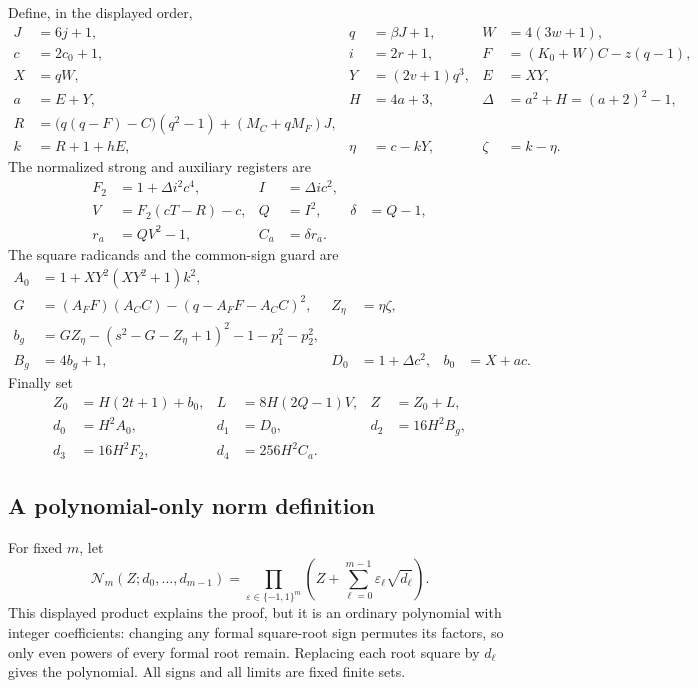 \documentclass[11pt]{article}
\newcommand{\Nm}{\mathcal N}
\theoremstyle{remark}
\begin{document}
Define, in the displayed order,
\begin{align}
 J&=6j+1,&q&=\beta J+1,&W&=4(3w+1),\nonumber\\
 c&=2c_0+1,& i&=2r+1,&
 F&=(K_0+W)C-z(q-1),                                      \label{eq:register1}\\
 X&=qW,&Y&=(2v+1)q^3,&E&=XY,\nonumber\\
 a&=E+Y,&H&=4a+3,&\Delta&=a^2+H=(a+2)^2-1,\nonumber\\
 R&=\bigl(q(q-F)-C\bigr)(q^2-1)+(M_C+qM_F)J,\nonumber\\
 k&=R+1+hE,&\eta&=c-kY,&\zeta&=k-\eta.                      \label{eq:register2}
\end{align}
The normalized strong and auxiliary registers are
\begin{align}
 F_2&=1+\Delta i^2c^4,& I&=\Delta i c^2,\nonumber\\
 V&=F_2(cT-R)-c,&Q&=I^2,&\delta&=Q-1,\nonumber\\
 r_a&=QV^2-1,& C_a&=\delta r_a.                             \label{eq:register3}
\end{align}
The square radicands and the common-sign guard are
\begin{align}
 A_0&=1+XY^2(XY^2+1)k^2,\nonumber\\
 G&=(A_FF)(A_CC)-(q-A_FF-A_CC)^2,&Z_\eta&=\eta\zeta,\nonumber\\
 b_g&=GZ_\eta-(s^2-G-Z_\eta+1)^2-1-p_1^2-p_2^2,\nonumber\\
 B_g&=4b_g+1,&D_0&=1+\Delta c^2,&b_0&=X+ac.                 \label{eq:register4}
\end{align}
Finally set
\begin{align}
 Z_0&=H(2t+1)+b_0,&
 L&=8H(2Q-1)V,&Z&=Z_0+L,\nonumber\\
 d_0&=H^2A_0,&d_1&=D_0,&d_2&=16H^2B_g,\nonumber\\
 d_3&=16H^2F_2,&d_4&=256H^2C_a.                            \label{eq:register5}
\end{align}

\subsection{A polynomial-only norm definition}

For fixed \(m\), let
\[
 \Nm_m(Z;d_0,\ldots,d_{m-1})
   =\prod_{\varepsilon\in\{-1,1\}^m}
     \left(Z+\sum_{\ell=0}^{m-1}\varepsilon_\ell\sqrt{d_\ell}\right).
                                                               \label{eq:formalnorm}
\]
This displayed product explains the proof, but it is an ordinary polynomial
with integer coefficients: changing any formal square-root sign permutes its
factors, so only even powers of every formal root remain. Replacing each
root square by \(d_\ell\) gives the polynomial. All signs and all limits are
fixed finite sets.
\end{document}
